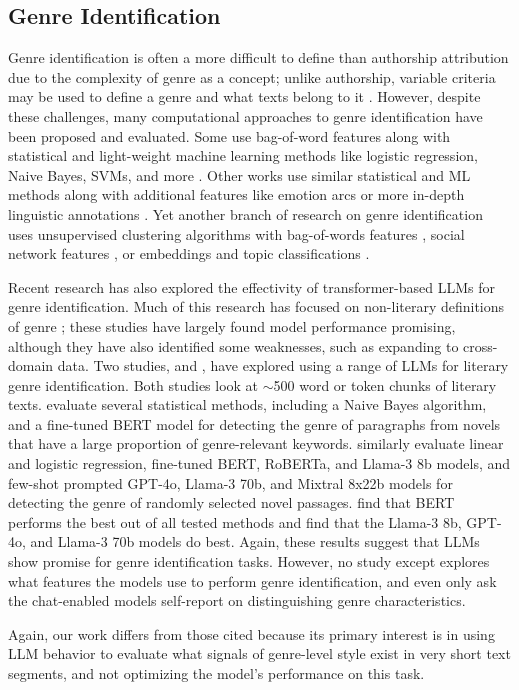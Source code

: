 \subsection{Genre Identification}

Genre identification is often a more difficult to define than authorship attribution due to the complexity of genre as a concept; unlike authorship, variable criteria may be used to define a genre and what texts belong to it \citep{underwood2016genres}. However, despite these challenges, many computational approaches to genre identification have been proposed and evaluated. Some use bag-of-word features along with statistical and light-weight machine learning methods like logistic regression, Naive Bayes, SVMs, and more \citep{allison2011quantitative, underwood2016genres, underwood2013mapping, hettinger2016classification, sharmaa2020rise}. Other works use similar statistical and ML methods along with additional features like emotion arcs \citep{kim-etal-2017-investigating} or more in-depth linguistic annotations \citep{calvo2021novel}. Yet another branch of research on genre identification uses unsupervised clustering algorithms with bag-of-words features \citep{al2018stylometric}, social network features \citep{ardanuy2015clustering, coll-ardanuy-sporleder-2014-structure}, or embeddings and topic classifications \citep{sobchuk2024computational}.

Recent research has also explored the effectivity of transformer-based LLMs for genre identification. Much of this research has focused on non-literary definitions of genre \citep{UCHIDA2024100089, kuzman2023troubling, roussinov2025controlling, make5030059}; these studies have largely found model performance promising, although they have also identified some weaknesses, such as expanding to cross-domain data. Two studies, \citet{liu2020deepgenre} and \citet{bamman2024classification}, have explored using a range of LLMs for literary genre identification. Both studies look at $\sim$500 word or token chunks of literary texts. \citet{liu2020deepgenre} evaluate several statistical methods, including a Naive Bayes algorithm, and a fine-tuned BERT model for detecting the genre of paragraphs from novels that have a large proportion of genre-relevant keywords. \citet{bamman2024classification} similarly evaluate linear and logistic regression, fine-tuned BERT, RoBERTa, and Llama-3 8b models, and few-shot prompted GPT-4o, Llama-3 70b, and Mixtral 8x22b models for detecting the genre of randomly selected novel passages. \citet{liu2020deepgenre} find that BERT performs the best out of all tested methods and \citet{bamman2024classification} find that the Llama-3 8b, GPT-4o, and Llama-3 70b models do best. Again, these results suggest that LLMs show promise for genre identification tasks. However, no study except \citet{bamman2024classification} explores what features the models use to perform genre identification, and even \citet{bamman2024classification} only ask the chat-enabled models self-report on distinguishing genre characteristics.

Again, our work differs from those cited because its primary interest is in using LLM behavior to evaluate what signals of genre-level style exist in very short text segments, and not optimizing the model's performance on this task.